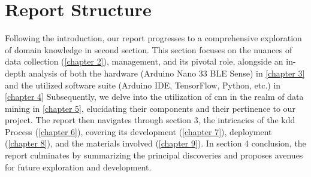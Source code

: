 \section{Report Structure}
	Following the introduction, our report progresses to a comprehensive exploration of domain knowledge in second section. This section focuses on the nuances of data collection (\ref{chapter 2}), management, and its pivotal role, alongside an in-depth analysis of both the hardware (Arduino Nano 33 BLE Sense) in \ref{chapter 3} and the utilized software suite (Arduino IDE, TensorFlow, Python, etc.) in \ref{chapter 4} Subsequently, we delve into the utilization of \ac{cnn} in the realm of data mining in \ref{chapter 5}, elucidating their components and their pertinence to our project. The report then navigates through section 3, the intricacies of the \ac{kdd} Process (\ref{chapter 6}), covering its development (\ref{chapter 7}), deployment (\ref{chapter 8}), and the materials involved (\ref{chapter 9}). In section 4 conclusion, the report culminates by summarizing the principal discoveries and proposes avenues for future exploration and development.

